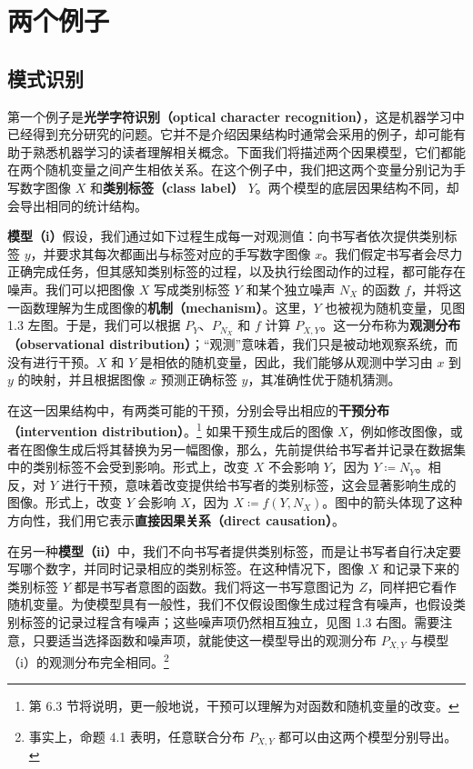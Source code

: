 \FloatBarrier
\section{两个例子}
\label{sec:two-examples}

\subsection{模式识别}
\label{sec:pattern-recognition}

第一个例子是\textbf{光学字符识别（optical character recognition）}，这是机器学习中已经得到充分研究的问题。它并不是介绍因果结构时通常会采用的例子，却可能有助于熟悉机器学习的读者理解相关概念。下面我们将描述两个因果模型，它们都能在两个随机变量之间产生相依关系。在这个例子中，我们把这两个变量分别记为手写数字图像 $X$ 和\textbf{类别标签（class label）} $Y$。两个模型的底层因果结构不同，却会导出相同的统计结构。

\textbf{模型（i）}假设，我们通过如下过程生成每一对观测值：向书写者依次提供类别标签 $y$，并要求其每次都画出与标签对应的手写数字图像 $x$。我们假定书写者会尽力正确完成任务，但其感知类别标签的过程，以及执行绘图动作的过程，都可能存在噪声。我们可以把图像 $X$ 写成类别标签 $Y$ 和某个独立噪声 $N_X$ 的函数 $f$，并将这一函数理解为生成图像的\textbf{机制（mechanism）}。这里，$Y$ 也被视为随机变量，见图 1.3 左图。于是，我们可以根据 $P_Y$、$P_{N_X}$ 和 $f$ 计算 $P_{X,Y}$。这一分布称为\textbf{观测分布（observational distribution）}；“观测”意味着，我们只是被动地观察系统，而没有进行干预。$X$ 和 $Y$ 是相依的随机变量，因此，我们能够从观测中学习由 $x$ 到 $y$ 的映射，并且根据图像 $x$ 预测正确标签 $y$，其准确性优于随机猜测。

在这一因果结构中，有两类可能的干预，分别会导出相应的\textbf{干预分布（intervention distribution）}。\footnote{第 6.3 节将说明，更一般地说，干预可以理解为对函数和随机变量的改变。}
如果干预生成后的图像 $X$，例如修改图像，或者在图像生成后将其替换为另一幅图像，那么，先前提供给书写者并记录在数据集中的类别标签不会受到影响。形式上，改变 $X$ 不会影响 $Y$，因为 $Y\coloneqq N_Y$。相反，对 $Y$ 进行干预，意味着改变提供给书写者的类别标签，这会显著影响生成的图像。形式上，改变 $Y$ 会影响 $X$，因为 $X\coloneqq f(Y,N_X)$。图中的箭头体现了这种方向性，我们用它表示\textbf{直接因果关系（direct causation）}。

在另一种\textbf{模型（ii）}中，我们不向书写者提供类别标签，而是让书写者自行决定要写哪个数字，并同时记录相应的类别标签。在这种情况下，图像 $X$ 和记录下来的类别标签 $Y$ 都是书写者意图的函数。我们将这一书写意图记为 $Z$，同样把它看作随机变量。为使模型具有一般性，我们不仅假设图像生成过程含有噪声，也假设类别标签的记录过程含有噪声；这些噪声项仍然相互独立，见图 1.3 右图。需要注意，只要适当选择函数和噪声项，就能使这一模型导出的观测分布 $P_{X,Y}$ 与模型（i）的观测分布完全相同。\footnote{事实上，命题 4.1 表明，任意联合分布 $P_{X,Y}$ 都可以由这两个模型分别导出。}

